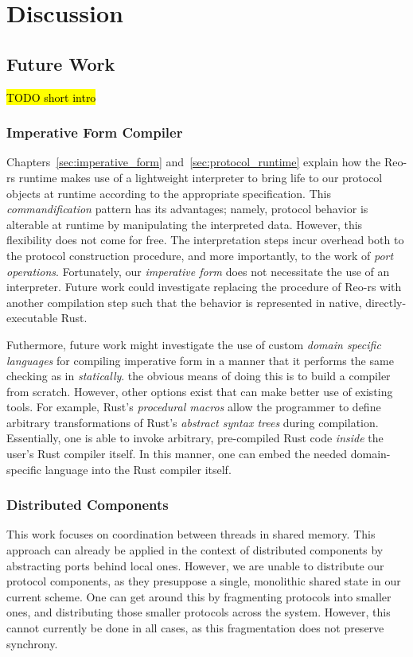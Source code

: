 \chapter{Discussion}
\label{sec:discussion}
\section{Future Work}
\hl{TODO short intro}
\subsection{Imperative Form Compiler}
Chapters~\ref{sec:imperative_form} and~\ref{sec:protocol_runtime} explain how the Reo-rs runtime makes use of a lightweight interpreter to bring life to our protocol objects at runtime according to the appropriate specification. This \textit{commandification} pattern has its advantages; namely, protocol behavior is alterable at runtime by manipulating the interpreted data. However, this flexibility does not come for free. The interpretation steps incur overhead both to the protocol construction procedure, and more importantly, to the work of \textit{port operations}. Fortunately, our \textit{imperative form} does not necessitate the use of an interpreter. Future work could investigate replacing the  procedure of Reo-rs with another compilation step such that the behavior is represented in native, directly-executable Rust. 

Futhermore, future work might investigate the use of custom \textit{domain specific languages} for compiling imperative form in a manner that it performs the same checking as in  \textit{statically}. the obvious means of doing this is to build a compiler from scratch. However, other options exist that can make better use of existing tools. For example, Rust's \textit{procedural macros} allow the programmer to define arbitrary transformations of Rust's \textit{abstract syntax trees} during compilation. Essentially, one is able to invoke arbitrary, pre-compiled Rust code \textit{inside} the user's Rust compiler itself. In this manner, one can embed the needed domain-specific language into the Rust compiler itself.

\subsection{Distributed Components}
This work focuses on coordination between threads in shared memory. This approach can already be applied in the context of distributed components by abstracting ports behind local ones. However, we are unable to distribute our protocol components, as they presuppose a single, monolithic shared state in our current scheme. One can get around this by fragmenting protocols into smaller ones, and distributing those smaller protocols across the system. However, this cannot currently be done in all cases, as this fragmentation does not preserve synchrony. 


